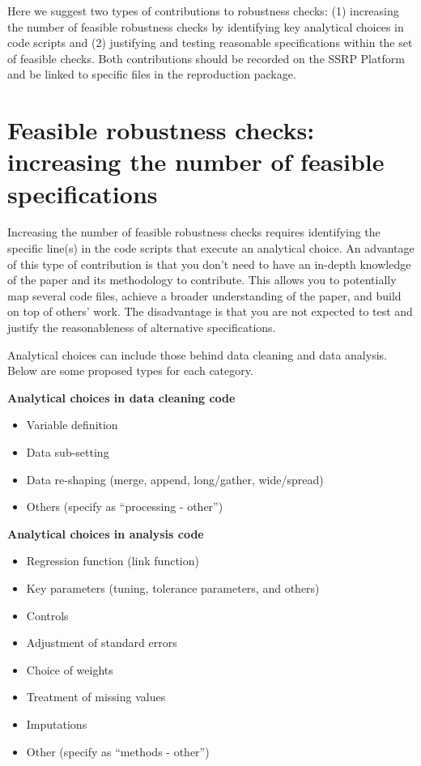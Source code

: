 \documentclass[
]{book}
\providecommand{\tightlist}{%
  \setlength{\itemsep}{0pt}\setlength{\parskip}{0pt}}
\begin{document}
Here we suggest two types of contributions to robustness checks: (1) increasing the number of feasible robustness checks by identifying key analytical choices in code scripts and (2) justifying and testing reasonable specifications within the set of feasible checks. Both contributions should be recorded on the SSRP Platform and be linked to specific files in the reproduction package.

\hypertarget{feasible-robustness-checks-increasing-the-number-of-feasible-specifications}{%
\section{Feasible robustness checks: increasing the number of feasible specifications}\label{feasible-robustness-checks-increasing-the-number-of-feasible-specifications}}

Increasing the number of feasible robustness checks requires identifying the specific line(s) in the code scripts that execute an analytical choice. An advantage of this type of contribution is that you don't need to have an in-depth knowledge of the paper and its methodology to contribute. This allows you to potentially map several code files, achieve a broader understanding of the paper, and build on top of others' work. The disadvantage is that you are not expected to test and justify the reasonableness of alternative specifications.

Analytical choices can include those behind data cleaning and data analysis. Below are some proposed types for each category.

\textbf{Analytical choices in data cleaning code}

\begin{itemize}
\tightlist
\item
  Variable definition
\item
  Data sub-setting
\item
  Data re-shaping (merge, append, long/gather, wide/spread)
\item
  Others (specify as ``processing - other'')
\end{itemize}

\textbf{Analytical choices in analysis code}

\begin{itemize}
\tightlist
\item
  Regression function (link function)
\item
  Key parameters (tuning, tolerance parameters, and others)
\item
  Controls
\item
  Adjustment of standard errors
\item
  Choice of weights
\item
  Treatment of missing values
\item
  Imputations
\item
  Other (specify as ``methods - other'')
\end{itemize}
\end{document}
